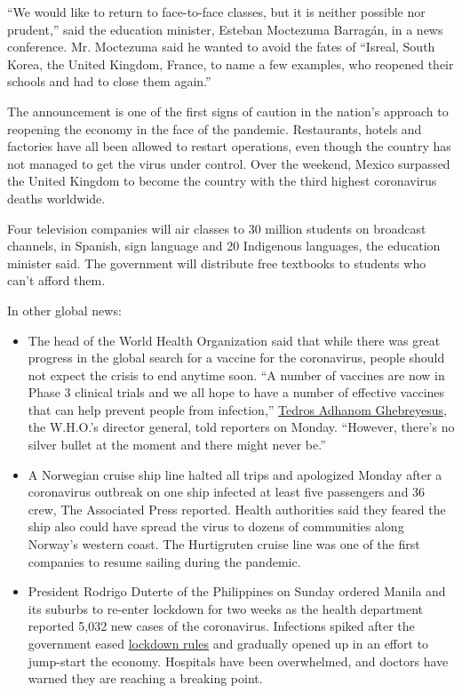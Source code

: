 ``We would like to return to face-to-face classes, but it is neither
possible nor prudent,'' said the education minister, Esteban Moctezuma
Barragán, in a news conference. Mr. Moctezuma said he wanted to avoid
the fates of ``Isreal, South Korea, the United Kingdom, France, to name
a few examples, who reopened their schools and had to close them
again.''

The announcement is one of the first signs of caution in the nation's
approach to reopening the economy in the face of the pandemic.
Restaurants, hotels and factories have all been allowed to restart
operations, even though the country has not managed to get the virus
under control. Over the weekend, Mexico surpassed the United Kingdom to
become the country with the third highest coronavirus deaths worldwide.

Four television companies will air classes to 30 million students on
broadcast channels, in Spanish, sign language and 20 Indigenous
languages, the education minister said. The government will distribute
free textbooks to students who can't afford them.

In other global news:

\begin{itemize}
\tightlist
\item
  The head of the World Health Organization said that while there was
  great progress in the global search for a vaccine for the coronavirus,
  people should not expect the crisis to end anytime soon. ``A number of
  vaccines are now in Phase 3 clinical trials and we all hope to have a
  number of effective vaccines that can help prevent people from
  infection,'' \href{https://twitter.com/DrTedros}{Tedros Adhanom
  Ghebreyesus}, the W.H.O.'s director general, told reporters on Monday.
  ``However, there's no silver bullet at the moment and there might
  never be.''
\end{itemize}

\begin{itemize}
\item
  A Norwegian cruise ship line halted all trips and apologized Monday
  after a coronavirus outbreak on one ship infected at least five
  passengers and 36 crew, The Associated Press reported. Health
  authorities said they feared the ship also could have spread the virus
  to dozens of communities along Norway's western coast. The Hurtigruten
  cruise line was one of the first companies to resume sailing during
  the pandemic.
\item
  President Rodrigo Duterte of the Philippines on Sunday ordered Manila
  and its suburbs to re-enter lockdown for two weeks as the health
  department reported 5,032 new cases of the coronavirus. Infections
  spiked after the government eased
  \href{https://www.nytimes3xbfgragh.onion/2020/04/15/world/asia/manila-coronavirus-lockdown-slum.html}{lockdown
  rules} and gradually opened up in an effort to jump-start the economy.
  Hospitals have been overwhelmed, and doctors have warned they are
  reaching a breaking point.
\end{itemize}

